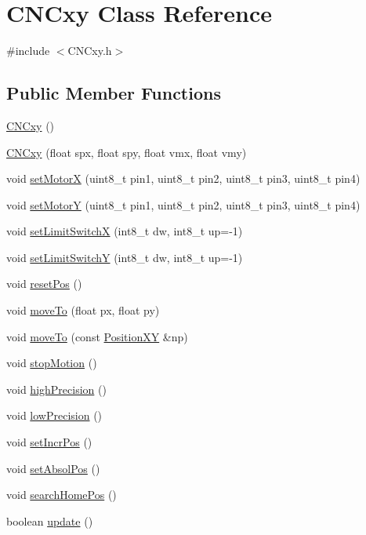 \hypertarget{class_c_n_cxy}{\section{C\+N\+Cxy Class Reference}
\label{class_c_n_cxy}
}


{\ttfamily \#include $<$C\+N\+Cxy.\+h$>$}

\subsection*{Public Member Functions}
\begin{DoxyCompactItemize}
\item 
\hyperlink{class_c_n_cxy_a00b982f5e1cdf7d14e2b812fe634381a}{C\+N\+Cxy} ()
\item 
\hyperlink{class_c_n_cxy_adf2aa57e924162dcd02728eca3ce6ad4}{C\+N\+Cxy} (float spx, float spy, float vmx, float vmy)
\item 
void \hyperlink{class_c_n_cxy_a142e650698bd84530db0dc5c35a73df1}{set\+Motor\+X} (uint8\+\_\+t pin1, uint8\+\_\+t pin2, uint8\+\_\+t pin3, uint8\+\_\+t pin4)
\item 
void \hyperlink{class_c_n_cxy_a9363dc5278db1600ddae0615b3a4b977}{set\+Motor\+Y} (uint8\+\_\+t pin1, uint8\+\_\+t pin2, uint8\+\_\+t pin3, uint8\+\_\+t pin4)
\item 
void \hyperlink{class_c_n_cxy_a32366595a9f719290e51bced4c50aef5}{set\+Limit\+Switch\+X} (int8\+\_\+t dw, int8\+\_\+t up=-\/1)
\item 
void \hyperlink{class_c_n_cxy_a0cb32c93e873b72091d8fadd8d6f00ca}{set\+Limit\+Switch\+Y} (int8\+\_\+t dw, int8\+\_\+t up=-\/1)
\item 
void \hyperlink{class_c_n_cxy_a2a0b5a7d65b3391a8e7e372aea2f670b}{reset\+Pos} ()
\item 
void \hyperlink{class_c_n_cxy_aeb30f9045a768b51b12521d032410631}{move\+To} (float px, float py)
\item 
void \hyperlink{class_c_n_cxy_a50739c5a639e2df4490725cb4893fe0d}{move\+To} (const \hyperlink{class_position_x_y}{Position\+X\+Y} \&np)
\item 
void \hyperlink{class_c_n_cxy_a1a20b3274b2cfcf28643ee50448d0406}{stop\+Motion} ()
\item 
void \hyperlink{class_c_n_cxy_a223b08f9efc7dc01cd43d2f5ddcf579e}{high\+Precision} ()
\item 
void \hyperlink{class_c_n_cxy_ad03042cf9aca863757e9fa17e216ca5c}{low\+Precision} ()
\item 
void \hyperlink{class_c_n_cxy_a8ce21ffa89d36b44eec760eadecf78d9}{set\+Incr\+Pos} ()
\item 
void \hyperlink{class_c_n_cxy_a61a22cacc98260960d4a4baf07fc9fb0}{set\+Absol\+Pos} ()
\item 
void \hyperlink{class_c_n_cxy_abe9aebdad9261020e38f2b0490fa5221}{search\+Home\+Pos} ()
\item 
boolean \hyperlink{class_c_n_cxy_ab30c0d98fe52c61abd63e1abb2ae1b69}{update} ()
\end{DoxyCompactItemize}


